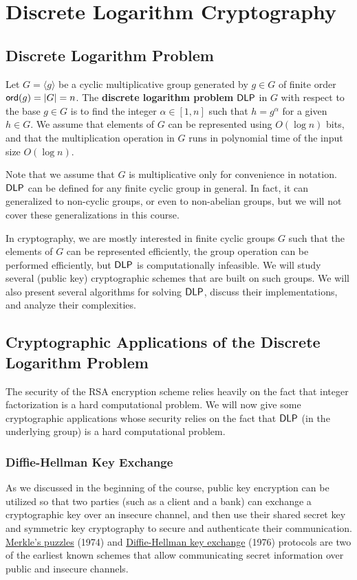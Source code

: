 \section{Discrete Logarithm Cryptography}

\subsection{Discrete Logarithm Problem}
Let $G = \langle g \rangle$ be a cyclic multiplicative group generated by 
$g \in G$ of finite order ${\sf ord}(g) = |G| = n$. The {\bf discrete logarithm 
problem} ${\sf DLP}$ in $G$ with respect to the base $g \in G$ is to find the integer 
$\alpha \in [1, n]$ such that $h = g^\alpha$ for a given $h \in G$. We assume 
that elements of $G$ can be represented using $O(\log n)$ bits, and that the 
multiplication operation in $G$ runs in polynomial time of the input size 
$O(\log n)$. 

Note that we assume that $G$ is multiplicative only for convenience in notation. 
${\sf DLP}$ can be defined for any finite cyclic group in general. In fact, it 
can generalized to non-cyclic groups, or even to non-abelian groups, but we will 
not cover these generalizations in this course. 

In cryptography, we are mostly interested in finite cyclic groups $G$ such that 
the elements of $G$ can be represented efficiently, the group operation can be 
performed efficiently, but ${\sf DLP}$ is computationally infeasible. We will study 
several (public key) cryptographic schemes that are built on such groups. We 
will also present several algorithms for solving ${\sf DLP}$, discuss their 
implementations, and analyze their complexities. 

\subsection{Cryptographic Applications of the Discrete Logarithm Problem}
The security of the RSA encryption scheme relies heavily on the fact that integer 
factorization is a hard computational problem. We will now give some cryptographic
applications whose security relies on the fact that ${\sf DLP}$ (in the underlying 
group) is a hard computational problem. 

\subsubsection{Diffie-Hellman Key Exchange}
As we discussed in the beginning of the course, public key encryption can be 
utilized so that two parties (such as a client and a bank) can exchange a 
cryptographic key over an insecure channel, and then use their shared secret 
key and symmetric key cryptography to secure and authenticate their communication. 
\href{https://en.wikipedia.org/wiki/Merkle%27s_Puzzles}{Merkle's puzzles} (1974) 
and \href{https://en.wikipedia.org/wiki/Diffie%E2%80%93Hellman_key_exchange}
{Diffie-Hellman key exchange} (1976) protocols are two of the earliest known 
schemes that allow communicating secret information over public and insecure 
channels. 

